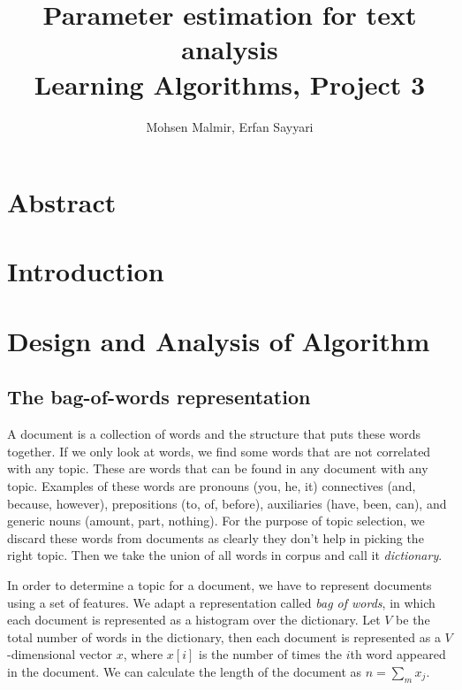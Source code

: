 \documentclass[twoside,12pt]{article}
\begin{document}
\title{Parameter estimation for text analysis\\  Learning Algorithms, Project 3}
\author{Mohsen Malmir, Erfan Sayyari}
\maketitle
\section{Abstract}


\section{Introduction}



\section{Design and Analysis of Algorithm}

\subsection{The bag-of-words representation}
A document is a collection of words and the structure that puts these words together. If we only look at words, we find some words that are not correlated with any topic. These are words that can be found in any document with any topic. Examples of these words are pronouns (you, he, it) connectives (and, because, however), prepositions (to, of, before), auxiliaries (have, been, can), and generic nouns (amount, part, nothing). For the purpose of topic selection, we discard these words from documents as clearly they don't help in picking the right topic. Then we take the union of all words in corpus and call it \emph{dictionary}.

In order to determine a topic for a document, we have to represent  documents using a set of features. We adapt a representation called \emph{bag of words}, in which each document is represented as a histogram over the dictionary. Let $V$ be the total number of words in the dictionary, then each document is represented as a $V$-dimensional vector $x$, where $x[i]$ is the number of times the $i$th word appeared in the document. We can calculate the length of the document as $n=\sum_{m}x_j.$
\end{document}
